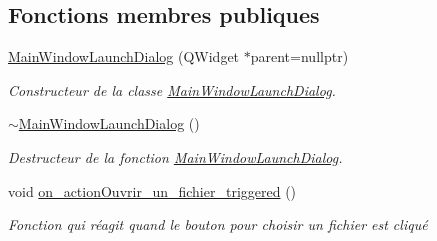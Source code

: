 \subsection*{Fonctions membres publiques}
\begin{DoxyCompactItemize}
\item 
\hyperlink{classMainWindowLaunchDialog_a9f7ef6d5da5eff43adb6ea835f0790d0}{Main\+Window\+Launch\+Dialog} (Q\+Widget $\ast$parent=nullptr)
\begin{DoxyCompactList}\small\item\em Constructeur de la classe \hyperlink{classMainWindowLaunchDialog}{Main\+Window\+Launch\+Dialog}. \end{DoxyCompactList}\item 
\hyperlink{classMainWindowLaunchDialog_abf8a63fe899ba6d8fcbdf179122dfcb7}{$\sim$\+Main\+Window\+Launch\+Dialog} ()
\begin{DoxyCompactList}\small\item\em Destructeur de la fonction \hyperlink{classMainWindowLaunchDialog}{Main\+Window\+Launch\+Dialog}. \end{DoxyCompactList}\item 
void \hyperlink{classMainWindowLaunchDialog_a0cfb74c6cb22582d2b1047332008b9c0}{on\+\_\+action\+Ouvrir\+\_\+un\+\_\+fichier\+\_\+triggered} ()
\begin{DoxyCompactList}\small\item\em Fonction qui réagit quand le bouton pour choisir un fichier est cliqué \end{DoxyCompactList}\end{DoxyCompactItemize}
